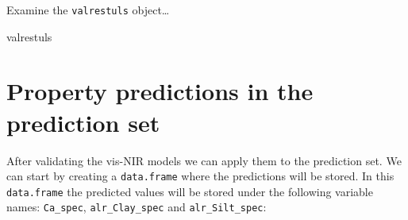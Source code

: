 \documentclass[]{book}
\newenvironment{Shaded}{\begin{snugshade}}{\end{snugshade}}
\newcommand{\NormalTok}[1]{#1}
\begin{document}
Examine the \texttt{valrestuls} object\ldots{}

\begin{Shaded}
\begin{Highlighting}[]
\NormalTok{valrestuls}
\end{Highlighting}
\end{Shaded}

\hypertarget{property-predictions-in-the-prediction-set}{%
\section{Property predictions in the prediction set}\label{property-predictions-in-the-prediction-set}}

After validating the vis-NIR models we can apply them to the prediction set.
We can start by creating a \texttt{data.frame} where the predictions will be stored. In this \texttt{data.frame} the predicted values will be stored under the following variable names: \texttt{Ca\_spec}, \texttt{alr\_Clay\_spec} and \texttt{alr\_Silt\_spec}:
\end{document}
